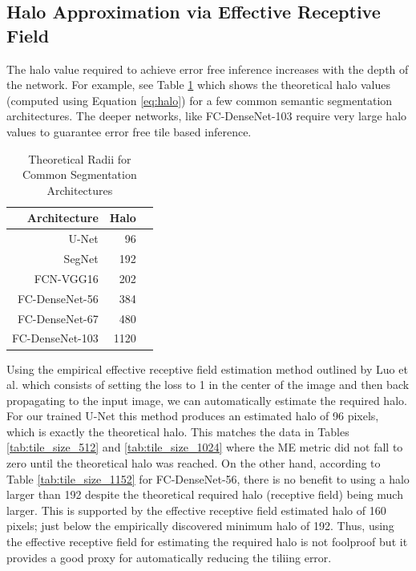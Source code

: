 \documentclass[runningheads]{llncs}
\begin{document}
\subsection{Halo Approximation via Effective Receptive Field}

The halo value required to achieve error free inference increases with the depth of the network. For example, see Table \ref{tab:common_radii} which shows the theoretical halo values (computed using Equation \ref{eq:halo}) for a few common semantic segmentation architectures. The deeper networks, like FC-DenseNet-103 require very large halo values to guarantee error free tile based inference.

\begin{table}
	\centering
	\caption{Theoretical Radii for Common Segmentation Architectures}
	\label{tab:common_radii}
	\begin{tabular}{r|r|r}
		Architecture & Halo &  \\ 
		\hline
		U-Net \cite{Ronneberger2015a} & 96 \\
		SegNet \cite{Badrinarayanan2015a} & 192 \\
		FCN-VGG16 \cite{Long2015} & 202 \\
		FC-DenseNet-56 \cite{Jegou2017} & 384 \\
		FC-DenseNet-67 \cite{Jegou2017} & 480 \\
		FC-DenseNet-103 \cite{Jegou2017} & 1120 \\
	\end{tabular}
\end{table}

Using the empirical effective receptive field estimation method outlined by Luo et al. \cite{Luo2016} which consists of setting the loss to 1 in the center of the image and then back propagating to the input image, we can automatically estimate the required halo. For our trained U-Net \cite{Ronneberger2015a} this method produces an estimated halo of 96 pixels, which is exactly the theoretical halo. This matches the data in Tables \ref{tab:tile_size_512} and \ref{tab:tile_size_1024} where the ME metric did not fall to zero until the theoretical halo was reached. On the other hand, according to Table \ref{tab:tile_size_1152} for FC-DenseNet-56, there is no benefit to using a halo larger than 192 despite the theoretical required halo (receptive field) being much larger. This is supported by the effective receptive field estimated halo of 160 pixels; just below the empirically discovered minimum halo of 192. Thus, using the effective receptive field for estimating the required halo is not foolproof but it provides a good proxy for automatically reducing the tiliing error. 
\end{document}
